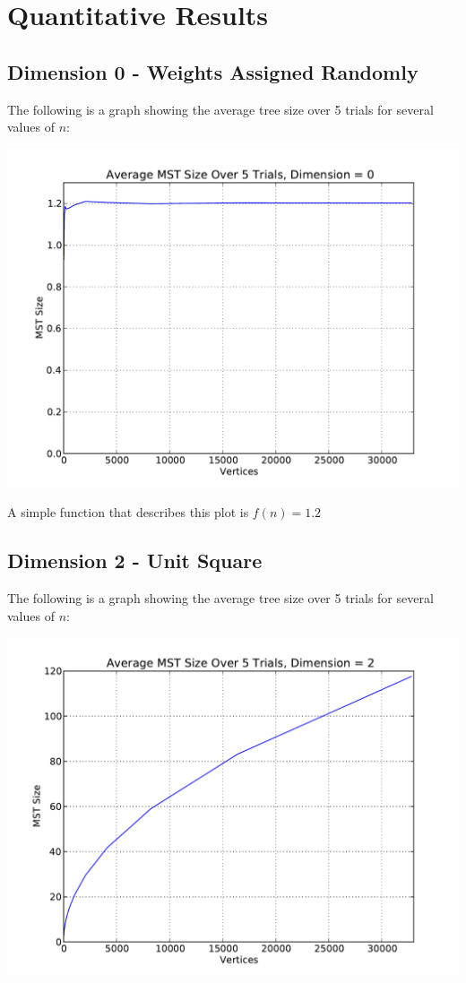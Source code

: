 \documentclass[solution, letterpaper]{cs121}
\begin{document}

\section{Quantitative Results}
\subsection*{Dimension 0 - Weights Assigned Randomly}

The following is a graph showing the average tree size over 5 trials for several values of $n$: 
\begin{center}
\includegraphics[scale=0.8]{kruskals-dimension-0.pdf}
\end{center}

A simple function that describes this plot is $f(n) = 1.2$
\pagebreak
\subsection*{Dimension 2 - Unit Square}

The following is a graph showing the average tree size over 5 trials for several values of $n$:
\begin{center}
\includegraphics[scale=0.8]{kruskals-dimension-2.pdf}
\end{center}
\end{document}

